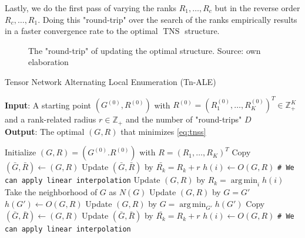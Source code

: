 \documentclass[11pt,a4paper,openright,oneside]{book}
\numberwithin{equation}{section}
\newcommand{\refeq}[1]{\cref{#1}}
\DeclareMathOperator{\TNS}{TNS}
\DeclareMathOperator*{\argmin}{arg\,min}
\begin{document}
{Lastly, we do the first pass of varying the ranks $R_1, \dots, R_c$ but in the reverse order $R_c, \dots, R_1$.
Doing this "round-trip" over the search of the ranks empirically results in a faster convergence rate to the
optimal $\TNS$ structure.

\begin{figure}[H]
    \centering
{}
\caption{The "round-trip" of updating the optimal structure. Source: own elaboration}
\end{figure}


\begin{algorithm}[h]
    \caption{Tensor Network Alternating Local Enumeration (Tn-ALE)}

    \hspace*{\algorithmicindent} \textbf{Input}: A starting point $(G^{(0)}, R^{(0)})$ with $R^{(0)} = (R_1^{(0)}, \dots, R_K^{(0)})^T \in \mathbb{Z}_+^K$ 
    and a rank-related radius $r \in \mathbb{Z}_+$ and the number of "round-trips" $D$ \\ 
    \hspace*{\algorithmicindent} \textbf{Output}: The optimal $(G, R)$ that minimizes \refeq{eq:tnss}

    \begin{algorithmic}[1]
        \State Initialize $(G, R) = (G^{(0)}. R^{(0)})$ with $R = (R_1, \dots, R_K)^T$
                    \State Copy $(\bar{G}, \bar{R}) \leftarrow (G, R)$
                    \State Update $(\bar{G}, \bar{R})$ by $\bar{R_k} = R_k + r$
                    \State $h(i) \leftarrow O(G, R)$ \qquad \verb/# We can apply linear interpolation/
                \EndFor
                \State Update $(G, R)$ by $R_k = \argmin_i h(i)$
            \EndFor
            \State Take the neighborhood of $G$ as $N(G)$
                \State Update $(G, R)$ by $G = G'$
                \State $h(G') \leftarrow O(G, R)$
            \EndFor
            \State Update $(G, R)$ by $G = \argmin_{G'} h(G')$
                    \State Copy $(\bar{G}, \bar{R}) \leftarrow (G, R)$
                    \State Update $(\bar{G}, \bar{R})$ by $\bar{R_k} = R_k + r$
                    \State $h(i) \leftarrow O(G, R)$ \qquad  \verb/# We can apply linear interpolation/


\end{algorithmic}
\end{algorithm}}
\end{document}
